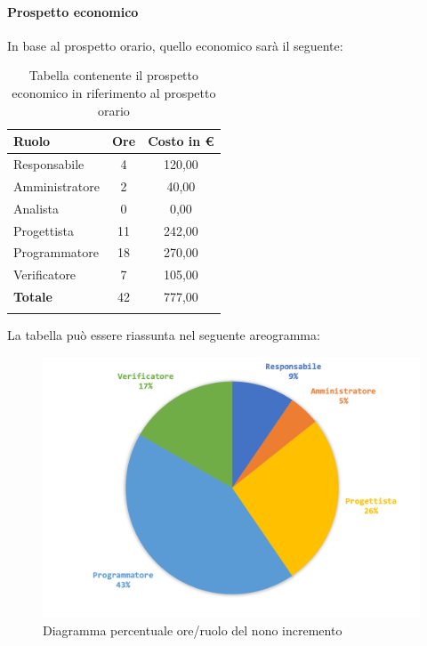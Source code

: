 		\paragraph{Prospetto economico}
		In base al prospetto orario, quello economico sarà il seguente: 
		
		\begin{longtable}{|l|c|c|}
			\hline
			\rowcolor{lighter-grayer}
			\textbf{Ruolo} & \textbf{Ore} & \textbf{Costo in € } \\
			\hline
			\endfirsthead
			
			\hline
			Responsabile 	    & 4 & 120,00\\
			\hline 
			\hline
			Amministratore	   & 2 & 40,00\\
			\hline
			\hline
			Analista 				& 0 & 0,00\\
			\hline
			\hline
			Progettista 		   & 11 & 242,00\\
			\hline
			\hline
			Programmatore 	  & 18 & 270,00\\
			\hline
			\hline
			Verificatore 		   & 7 & 105,00\\
			\hline
			\textbf{Totale} 	 & 42 & 777,00\\
			\hline
			\caption{Tabella contenente il prospetto economico in riferimento al prospetto orario}
		\end{longtable}
		
		La tabella può essere riassunta nel seguente areogramma:
		\begin{figure}[H]
			\centering
			\includegraphics[width=0.8\linewidth]{./images/preventivo/incremento9-2.png}
			\caption{Diagramma percentuale ore/ruolo del nono incremento}
			\label{fig:diagramma costi ruolo incremento IX}
		\end{figure}
		\pagebreak
		
